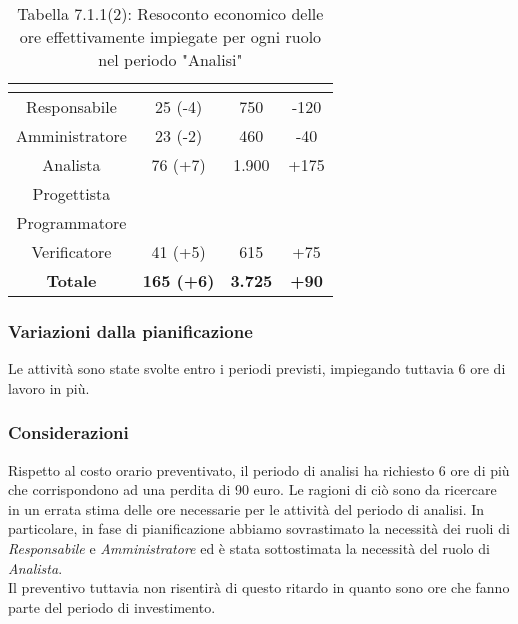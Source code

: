 \renewcommand{\arraystretch}{1.4}
\begin{table}[H]
\begin{center}
\begin{tabular}{|c|c|c|c|}
\hline
\rowcolor{title_row}
\textbf{\color{title_text}{Ruolo}}  & \textbf{\color{title_text}{Ore}} & \textbf{\color{title_text}{Costo in \euro}} & \textbf{\color{title_text}{Differenza al preventivo in \euro}} \\ \hline
Responsabile    & 25 (-4) & 750 & -120 \\ \hline
Amministratore  & 23 (-2) & 460 & -40 \\ \hline
Analista        & 76 (+7) & 1.900 & +175 \\ \hline
Progettista     & & &  \\ \hline
Programmatore   & & &  \\ \hline
Verificatore    & 41 (+5) & 615 & +75  \\ \hline
\textbf{Totale} & \textbf{165 (+6)}    & \textbf{3.725} & \textbf{+90} \\ \hline
\end{tabular}
\caption{Tabella 7.1.1(2): Resoconto economico delle ore effettivamente impiegate per ogni ruolo nel periodo "Analisi"\label{}}
\end{center}
\end{table}
\renewcommand{\arraystretch}{1}


\subsubsection{Variazioni dalla pianificazione}
Le attività sono state svolte entro i periodi previsti, impiegando tuttavia 6 ore di lavoro in più.

\subsubsection{Considerazioni}
Rispetto al costo orario preventivato, il periodo di analisi ha richiesto 6
ore di più che corrispondono ad una perdita di 90 euro. Le ragioni di ciò sono
da ricercare in un errata stima delle ore necessarie per le attività del periodo di analisi. In particolare, in fase di pianificazione abbiamo sovrastimato la necessità dei ruoli di \emph{Responsabile} e \emph{Amministratore} ed è stata sottostimata la necessità del ruolo di \emph{Analista}.  \\
Il preventivo tuttavia non risentirà di questo ritardo in quanto sono ore che fanno parte del periodo di investimento.
\pagebreak
